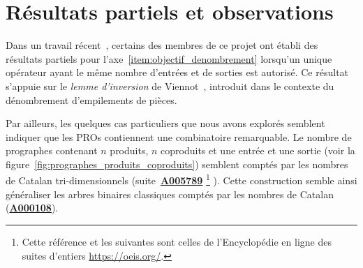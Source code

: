 \documentclass[10pt,reqno]{amsart}
\numberwithin{equation}{subsection}
\newcommand{\OEIS}[1]{\href{http://oeis.org/#1}{{\bf #1}}}
\begin{document}
\section{Résultats partiels et observations}
Dans un travail récent~\cite{BG14}, certains des membres de ce projet 
ont établi des résultats partiels pour 
l'axe~\ref{item:objectif_denombrement} lorsqu'un unique opérateur 
ayant le même nombre d'entrées et de sorties est autorisé. Ce résultat 
s'appuie sur le {\em lemme d'inversion} de Viennot~\cite{Vie86},
introduit dans le contexte du dénombrement d'empilements de pièces. 


Par ailleurs, les quelques cas particuliers que nous avons explorés 
semblent indiquer 
que les PROs contiennent une combinatoire remarquable. Le nombre de 
prographes contenant $n$ produits, $n$ coproduits et une entrée et une 
sortie (voir la
figure~\ref{fig:prographes_produits_coproduits}) semblent comptés par 
les nombres de Catalan tri-dimensionnels (suite~\OEIS{A005789}%
\footnote{Cette référence et les suivantes sont celles de l'Encyclopédie 
en ligne des suites d'entiers \url{https://oeis.org/}.}%
). Cette construction semble ainsi généraliser les arbres binaires 
classiques comptés par les nombres de Catalan (\OEIS{A000108}). 
\end{document}
